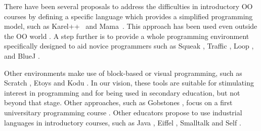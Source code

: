 



There have been several proposals to address the difficulties in introductory OO courses 
by defining a specific language which provides a simplified programming model,
such as Karel++~\cite{bergin_karel++:_1996} and Mama~\cite{harrisonmama}.
This approach has been used even outside the OO world \cite{feurzeig_programming-languages_1970, pattis_karel_1981, lopez_nombre_2012}.
A step further is to provide a whole programming environment specifically designed to aid novice programmers 
such as Squeak \cite{ingalls_back_1997}, 
Traffic \cite{broy_outside-method_2003},
Loop \cite{griggio_programming_2011}, 
and BlueJ \cite{bennedsen_bluej_2010}.

Other environments make use of block-based or visual programming, 
such as Scratch \cite{malan_scratch_2007}, Etoys \cite{lee_empowering_2011} and Kodu \cite{kodu}. 
In our vision, these tools are suitable for stimulating interest in programming and for being used in secondary education, but not beyond that stage.
Other approaches, such as Gobstones \cite{lopez_nombre_2012}, focus on a first universitary programming course%
.
Other educators propose to use industrial languages in introductory courses, 
such as Java \cite{kolling2001guidelines}, Eiffel \cite{meyer1993towards, broy_outside-method_2003}, Smalltalk \cite{ducasse2006squeak} and Self \cite{Unga87a}.


